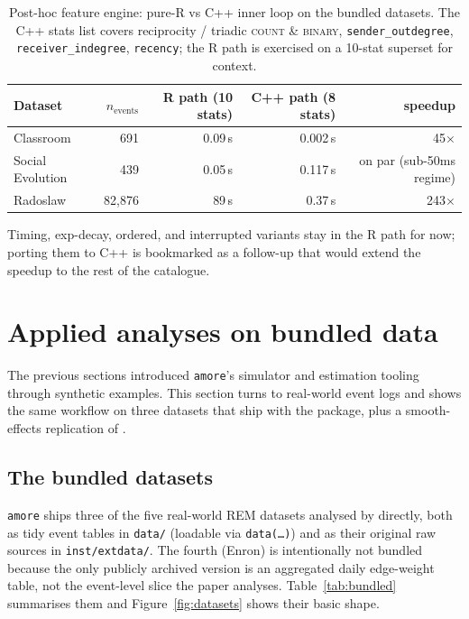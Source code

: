 \documentclass[11pt,a4paper]{article}
\begin{document}
\begin{table}[h]
\centering
\small
\begin{tabular}{lrrrr}
\toprule
Dataset & $n_\text{events}$ & R path (10 stats) &
                              C++ path (8 stats) & speedup \\
\midrule
Classroom         &     691 & 0.09\,s &  0.002\,s &  45$\times$ \\
Social Evolution  &     439 & 0.05\,s &  0.117\,s &
                                       on par (sub-50ms regime) \\
Radoslaw          &  82{,}876 & 89\,s   &  0.37\,s & 243$\times$ \\
\bottomrule
\end{tabular}
\caption{Post-hoc feature engine: pure-R vs C++ inner loop on the
bundled datasets. The C++ stats list covers reciprocity / triadic
\textsc{count} \& \textsc{binary}, \texttt{sender\_outdegree},
\texttt{receiver\_indegree}, \texttt{recency}; the R path is
exercised on a 10-stat superset for context.}
\label{tab:bench-cpp}
\end{table}

Timing, exp-decay, ordered, and interrupted variants stay in the
R path for now; porting them to C++ is bookmarked as a follow-up
that would extend the speedup to the rest of the catalogue.

\section{Applied analyses on bundled data}\label{sec:applied}

The previous sections introduced \texttt{amore}'s simulator and
estimation tooling through synthetic examples. This section
turns to real-world event logs and shows the same workflow on
three datasets that ship with the package, plus a smooth-effects
replication of \citet[Figure 6]{juozaitiene2024about}.

\subsection{The bundled datasets}\label{sec:bundled}

\texttt{amore} ships three of the five real-world REM datasets
analysed by \citet{juozaitiene2024about} directly, both as tidy
event tables in \texttt{data/} (loadable via
\texttt{data(\dots)}) and as their original raw sources in
\texttt{inst/extdata/}. The fourth (Enron) is intentionally not
bundled because the only publicly archived version is an
aggregated daily edge-weight table, not the event-level slice the
paper analyses. Table~\ref{tab:bundled} summarises them and
Figure~\ref{fig:datasets} shows their basic shape.
\end{document}
